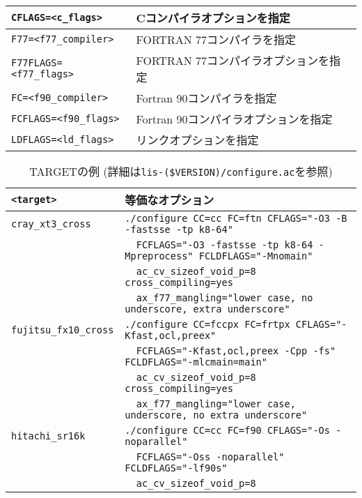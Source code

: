 \documentclass[a4paper]{jarticle}
\begin{document}
\begin{table}[htbp]
\begin{center}
\begin{tabular}{|l|l|}
\verb+CFLAGS=<c_flags>+    & Cコンパイラオプションを指定\\ \hline
\verb+F77=<f77_compiler>+    & FORTRAN 77コンパイラを指定\\ \hline
\verb+F77FLAGS=<f77_flags>+    & FORTRAN 77コンパイラオプションを指定\\ \hline
\verb+FC=<f90_compiler>+    & Fortran 90コンパイラを指定\\ \hline
\verb+FCFLAGS=<f90_flags>+    & Fortran 90コンパイラオプションを指定\\ \hline
\verb+LDFLAGS=<ld_flags>+    & リンクオプションを指定\\ \hline
\end{tabular}
\end{center}
\end{table}
\begin{table}[htbp]
\caption{TARGETの例 (詳細は{\tt lis-(\$VERSION)/configure.ac}を参照) }
\label{targetoption}
\begin{center}
\begin{tabular}{|l|l|}
\hline
\verb+<target>+           & 等価なオプション \\ \hline
\verb+cray_xt3_cross+     & \verb+./configure CC=cc FC=ftn CFLAGS="-O3 -B -fastsse -tp k8-64"+ \\
                          & \verb+  FCFLAGS="-O3 -fastsse -tp k8-64 -Mpreprocess" FCLDFLAGS="-Mnomain"+\\
                          & \verb+  ac_cv_sizeof_void_p=8 cross_compiling=yes+\\
                          & \verb+  ax_f77_mangling="lower case, no underscore, extra underscore"+ \\ \hline
\verb+fujitsu_fx10_cross+ & \verb|./configure CC=fccpx FC=frtpx CFLAGS="-Kfast,ocl,preex"| \\
                          & \verb+  FCFLAGS="-Kfast,ocl,preex -Cpp -fs" FCLDFLAGS="-mlcmain=main"+\\
                          & \verb+  ac_cv_sizeof_void_p=8 cross_compiling=yes+\\
                          & \verb+  ax_f77_mangling="lower case, underscore, no extra underscore"+ \\ \hline
\verb+hitachi_sr16k+      & \verb|./configure CC=cc FC=f90 CFLAGS="-Os -noparallel"| \\
                          & \verb+  FCFLAGS="-Oss -noparallel" FCLDFLAGS="-lf90s"+ \\
                          & \verb+  ac_cv_sizeof_void_p=8+ \\

\end{tabular}
\end{center}
\end{table}
\end{document}
